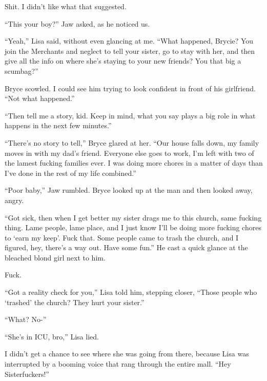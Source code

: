 Shit.  I didn't like what that suggested.



``This your boy?'' Jaw asked, as he noticed us.



``Yeah,'' Lisa said, without even glancing at me.  ``What happened, Brycie?  You join the Merchants and neglect to tell your sister, go to stay with her, and then give all the info on where she's staying to your new friends?  You that big a scumbag?''



Bryce scowled.  I could see him trying to look confident in front of his girlfriend.  ``Not what happened.''



``Then tell me a story, kid.  Keep in mind, what you say plays a big role in what happens in the next few minutes.''



``There's no story to tell,'' Bryce glared at her.  ``Our house falls down, my family moves in with my dad's friend.  Everyone else goes to work, I'm left with two of the lamest fucking families ever.  I was doing more chores in a matter of days than I've done in the rest of my life combined.''



``Poor baby,'' Jaw rumbled.  Bryce looked up at the man and then looked away, angry.



``Got sick, then when I get better my sister drags me to this church, same fucking thing.  Lame people, lame place, and I just know I'll be doing more fucking chores to `earn my keep'.  Fuck that.  Some people came to trash the church, and I figured, hey, there's a way out.  Have some fun.''  He cast a quick glance at the bleached blond girl next to him.



Fuck.



``Got a reality check for you,'' Lisa told him, stepping closer, ``Those people who `trashed' the church?  They hurt your sister.''



``What?  No-''



``She's in ICU, bro,'' Lisa lied.



I didn't get a chance to see where she was going from there, because Lisa was interrupted by a booming voice that rang through the entire mall.  ``Hey Sisterfuckers!''



